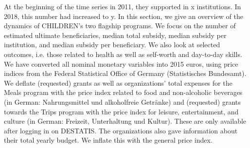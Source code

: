 \documentclass[12pt, a4paper]{article}\usepackage[]{graphicx}\usepackage[]{color}
\begin{document}

At the beginning of the time series in 2011, they supported in x institutions. In 2018, this number had increased to y. In this section, we give an overview of the dynamics of CHILDREN's two flagship programs. We focus on the number of estimated ultimate beneficiaries, median total subsidy, median subsidy per institution, and median subsidy per beneficiary. We also look at selected outcomes, i.e. those related to health as well as self-worth and day-to-day skills. We have converted all nominal monetary variables into 2015 euros, using price indices from the Federal Statistical Office of Germany (Statistisches Bundesamt). We deflate (requested) grants as well as organizations' total expenses for the Meals program  with the price index related to food and non-alcoholic beverages (in German: Nahrungsmittel und alkoholfreie Getränke) and (requested) grants towards the Trips program with the price index for leisure, entertainment, and culture (in German: Freizeit, Unterhaltung und Kultur). These are only available after logging in on DESTATIS. The organizations also gave information about their total yearly budget. We inflate this with the general price index.    
\end{document}
